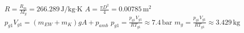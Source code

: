\( R = \frac{R_m}{M_g} = 266.289 \, \text{J/kg·K} \)  
\( A = \frac{\pi D^2}{4} = 0.00785 \, \text{m}^2 \)  
\( p_{g1} V_{g1} = (m_{EW} + m_K) g A + p_{amb} \)  
\( p_{g1} = \frac{p_{g1} V_{g1}}{R T_{g1}} \approx 7.4 \, \text{bar} \)  
\( m_g = \frac{p_{g1} V_{g1}}{R T_{g1}} \approx 3.429 \, \text{kg} \)